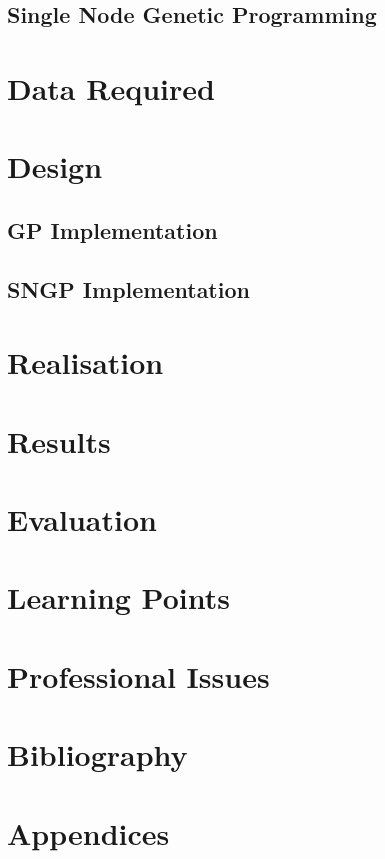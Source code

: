 \documentclass{article}
\begin{document}
		\subsection{Single Node Genetic Programming}
		 
		
	
	\section{Data Required}
	
	\section{Design}
	
		\subsection{GP Implementation}
		
		\subsection{SNGP Implementation}
	
	\section{Realisation}
	
	\section{Results}
	
	\section{Evaluation}
	
	\section{Learning Points}
	
	\section{Professional Issues}
	
	\section{Bibliography}
	
		
		
	
	\section{Appendices}
		
\end{document}
